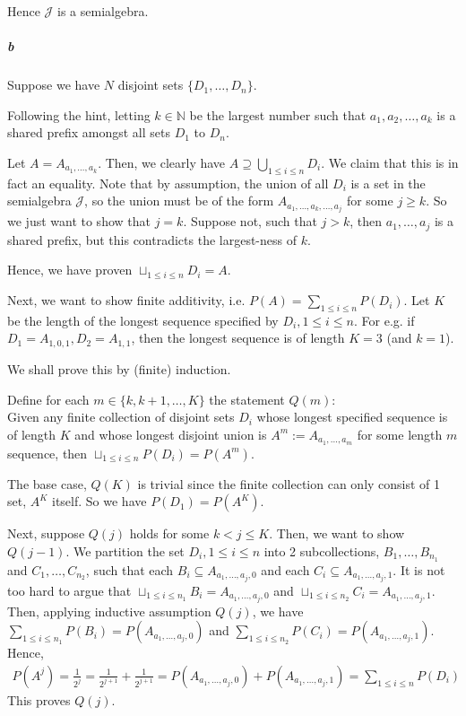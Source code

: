\documentclass[a4paper]{article}
\newcommand{\semialg}[0]{\mathcal{J}} %
\begin{document}
Hence $\semialg$ is a semialgebra.

\subparagraph{b} Suppose we have $N$ disjoint sets $\{D_1,\dots,D_n\}$.

Following the hint, letting $k\in \mathbb{N}$ be the largest number such that $a_1,a_2,\dots,a_k$ is a shared prefix amongst all sets $D_1$ to $D_n$.

Let $A=A_{a_1,\dots,a_k}$. Then, we clearly have $A\supseteq \bigcup_{1\leq i\leq n} D_i$. We claim that this is in fact an equality. Note that by assumption, the union of all $D_i$ is a set in the semialgebra $\semialg$, so the union must be of the form $A_{a_1,\dots,a_k,\dots,a_j}$ for some $j \geq k$. So we just want to show that $j=k$. Suppose not, such that $j>k$, then $a_1,\dots,a_j$ is a shared prefix, but this contradicts the largest-ness of $k$.

Hence, we have proven $\sqcup_{1\leq i\leq n}D_i = A$.

Next, we want to show finite additivity, i.e. $P(A) = \sum_{1\leq i\leq n}P(D_i)$. Let $K$ be the length of the longest sequence specified by $D_i, 1\leq i\leq n$. For e.g. if $D_1 = A_{1,0,1}, D_2 = A_{1,1}$, then the longest sequence is of length $K=3$ (and $k=1$).

We shall prove this by (finite) induction.

Define for each $m\in \{k,k+1,\dots,K\}$ the statement $Q(m)$:\\
Given any finite collection of disjoint sets $D_i$ whose longest specified sequence is of length $K$ and whose longest disjoint union is $A^m:=A_{a_1,\dots,a_m}$ for some length $m$ sequence, then $\sqcup_{1\leq i\leq n}P(D_i) = P(A^m)$.

The base case, $Q(K)$ is trivial since the finite collection can only consist of 1 set, $A^K$ itself. So we have $P(D_1) = P(A^K)$.

Next, suppose $Q(j)$ holds for some $k<j\leq K$. Then, we want to show $Q(j-1)$. We partition the set $D_i, 1\leq i\leq n$ into 2 subcollections, $B_1,\dots,B_{n_1}$ and $C_1,\dots,C_{n_2}$, such that each $B_i\subseteq A_{a_1,\dots,a_j,0}$ and each $C_i\subseteq A_{a_1,\dots,a_j,1}$. It is not too hard to argue that $\sqcup_{1\leq i\leq n_1} B_i = A_{a_1,\dots,a_j,0}$ and $\sqcup_{1\leq i\leq n_2} C_i = A_{a_1,\dots,a_j,1}$. Then, applying inductive assumption $Q(j)$, we have $\sum_{1\leq i\leq n_1}P(B_i) = P(A_{a_1,\dots,a_j,0})$ and $\sum_{1\leq i\leq n_2}P(C_i) = P(A_{a_1,\dots,a_j,1})$. Hence,
\begin{align*}
	P(A^j) = \frac{1}{2^j} = \frac{1}{2^{j+1}} + \frac{1}{2^{j+1}} = P(A_{a_1,\dots,a_j,0}) + P(A_{a_1,\dots,a_j,1}) = \sum_{1\leq i\leq n}P(D_i)
\end{align*}
This proves $Q(j)$.
\end{document}
